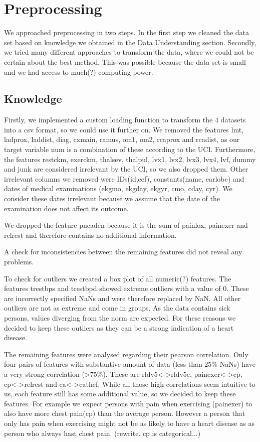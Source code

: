 \chapter{Preprocessing}
We approached preprocessing in two steps. In the first step we cleaned the data set based on knowledge we obtained in the Data Understanding section. 
Secondly, we tried many different approaches to transform the data, where we could not be certain about the best method. This was possible because the data set is small and we had access to much(?) computing power.
\section{Knowledge}
Firstly, we implemented a custom loading function to transform the 4 datasets into a csv format, so we could use it further on.
We removed the features lmt, ladprox, laddist, diag, cxmain, ramus, om1, om2, rcaprox and rcadist, as our target variable num is a combination of these according to the UCI. 
Furthermore, the features restckm, exerckm, thalsev, thalpul, lvx1, lvx2, lvx3, lvx4, lvf, dummy and junk are considered irrelevant by the UCI, so we also dropped them. Other irrelevant columns we removed were IDs(id,ccf), constants(name, earlobe) and dates of medical examinations (ekgmo, ekgday, ekgyr, cmo, cday, cyr). We consider these dates irrelevant because we assume that the date of  the examination does not affect its outcome. 

We dropped the feature pncaden because it is the sum of painlox, painexer and relrest and therefore contains no additional information. 

A check for inconsistencies between the remaining features did not reveal any problems. 

To check for outliers we created a box plot of all numeric(?) features. The features trestbps and trestbpd showed extreme outliers with a value of 0. These are incorrectly specified NaNs and were therefore replaced by NaN. All other outliers are not as extreme and come in groups. As the data contains sick persons, values diverging from the norm are expected. For these reasons we decided to keep these outliers as they can be a strong indication of a heart disease.

The remaining features were analysed regarding their pearson correlation. Only four pairs of features with substantive amount of data (less than 25\% NaNs) have a very strong correlation (>75\%).  These are rldv5<->rldv5e, painexer<->cp, cp<->relrest and ca<->cathef. While all those high correlations seem intuitive to us, each feature still has some additional value, so we decided to keep these features. For example we expect persons with pain when exercising (painexer) to also have more chest pain(cp) than the average person. However a person that only has pain when exercising might not be as likely to have a heart disease as as person who always hast chest pain. (rewrite. cp is categorical...)

